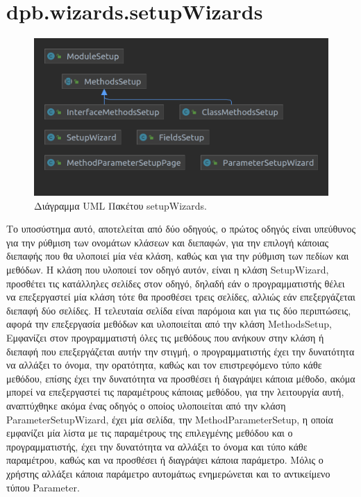 \section{dpb.wizards.setupWizards}
\label{sec:dpb.wizards.setupWizards}
\begin{figure}[H]
    \centering
    \includegraphics[width=1.0\textwidth]{Figures/setupWizard.png}
    \caption{Διάγραμμα UML Πακέτου setupWizards.}
    \label{fig:setupWizardUML}
\end{figure}
Το υποσύστημα αυτό, αποτελείται από δύο οδηγούς, ο πρώτος οδηγός είναι υπεύθυνος για την ρύθμιση των ονομάτων κλάσεων και διεπαφών, 
για την επιλογή κάποιας διεπαφής που θα υλοποιεί μία νέα κλάση, καθώς και για την ρύθμιση των πεδίων και μεθόδων. 
Η κλάση που υλοποιεί τον οδηγό αυτόν, είναι η κλάση SetupWizard, προσθέτει τις κατάλληλες σελίδες στον οδηγό, δηλαδή εάν ο προγραμματιστής 
θέλει να επεξεργαστεί μία κλάση τότε θα προσθέσει τρεις σελίδες, αλλιώς εάν επεξεργάζεται διεπαφή δύο σελίδες. 
Η τελευταία σελίδα είναι παρόμοια και για τις δύο περιπτώσεις, αφορά την επεξεργασία μεθόδων και υλοποιείται από την κλάση MethodsSetup,
Εμφανίζει στον προγραμματιστή όλες τις μεθόδους που ανήκουν στην κλάση ή διεπαφή που επεξεργάζεται αυτήν την στιγμή, 
ο προγραμματιστής έχει την δυνατότητα να αλλάξει το όνομα, την ορατότητα, καθώς και τον επιστρεφόμενο τύπο κάθε μεθόδου, 
επίσης έχει την δυνατότητα να προσθέσει ή διαγράψει κάποια μέθοδο, ακόμα μπορεί να επεξεργαστεί τις παραμέτρους κάποιας μεθόδου, 
για την λειτουργία αυτή, αναπτύχθηκε ακόμα ένας οδηγός ο οποίος υλοποιείται από την κλάση ParameterSetupWizard, 
έχει μία σελίδα, την MethodParameterSetup, η οποία εμφανίζει μία λίστα με τις παραμέτρους της επιλεγμένης μεθόδου και ο προγραμματιστής, 
έχει την δυνατότητα να αλλάξει το όνομα και τύπο κάθε παραμέτρου, καθώς και να προσθέσει ή διαγράψει κάποια παράμετρο. 
Μόλις ο χρήστης αλλάξει κάποια παράμετρο αυτομάτως ενημερώνεται και το αντικείμενο τύπου Parameter. 
